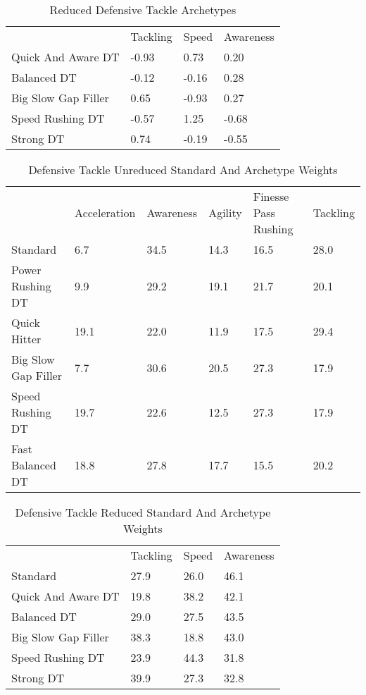 \documentclass[11pt]{article}
\begin{document}
\begin{table}[]
\centering
\caption{Reduced Defensive Tackle Archetypes}
\label{ReducedDefensiveTackle}
\begin{tabular}{llll}
                    & Tackling & Speed & Awareness \\
Quick And Aware DT  & -0.93    & 0.73  & 0.20      \\
Balanced DT         & -0.12    & -0.16 & 0.28      \\
Big Slow Gap Filler & 0.65     & -0.93 & 0.27      \\
Speed Rushing DT    & -0.57    & 1.25  & -0.68     \\
Strong DT           & 0.74     & -0.19 & -0.55    
\end{tabular}
\end{table}

\begin{table}[]
\centering
\caption{Defensive Tackle Unreduced Standard And Archetype Weights}
\label{DefensiveTackleUnreducedWeights}
\begin{tabular}{llllll}
                    & Acceleration & Awareness & Agility & Finesse Pass Rushing & Tackling \\
Standard            & 6.7          & 34.5      & 14.3    & 16.5                 & 28.0     \\
Power Rushing DT    & 9.9          & 29.2      & 19.1    & 21.7                 & 20.1     \\
Quick Hitter        & 19.1         & 22.0      & 11.9    & 17.5                 & 29.4     \\
Big Slow Gap Filler & 7.7          & 30.6      & 20.5    & 27.3                 & 17.9     \\
Speed Rushing DT    & 19.7         & 22.6      & 12.5    & 27.3                 & 17.9     \\
Fast Balanced DT    & 18.8         & 27.8      & 17.7    & 15.5                 & 20.2    
\end{tabular}
\end{table}

\begin{table}[]
\centering
\caption{Defensive Tackle Reduced Standard And Archetype Weights}
\label{DefensiveTackleReducedWeights}
\begin{tabular}{llll}
                    & Tackling & Speed & Awareness \\
Standard            & 27.9     & 26.0  & 46.1      \\
Quick And Aware DT  & 19.8     & 38.2  & 42.1      \\
Balanced DT         & 29.0     & 27.5  & 43.5      \\
Big Slow Gap Filler & 38.3     & 18.8  & 43.0      \\
Speed Rushing DT    & 23.9     & 44.3  & 31.8      \\
Strong DT           & 39.9     & 27.3  & 32.8     
\end{tabular}
\end{table}
\end{document}
